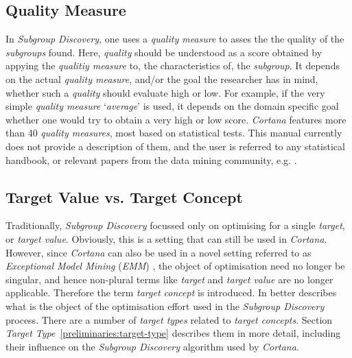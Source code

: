 \documentclass{article}
\begin{document}



\subsection{Quality Measure}
\label{preliminatier:quality-measure}
In \emph{Subgroup Discovery}, one uses a \emph{quality measure} to asses the the quality of the \emph{subgroups} found.
Here, \emph{quality} should be understood as a score obtained by appying the \emph{qualitiy measure} to, the characteristics of, the \emph{subgroup}.
It depends on the actual \emph{quality measure}, and/or the goal the researcher has in mind, whether such a \emph{quality} should evaluate high or low.
For example, if the very simple \emph{quality measure} `\emph{average}' is used, it depends on the domain specific goal whether one would try to obtain a very high or low score.
\emph{Cortana} features more than 40 \emph{quality measures}, most based on statistical tests.
This manual currently does not provide a description of them, and the user is referred to any statistical handbook, or relevant papers from the data mining community, e.g. \cite{shb,remauv}.



\subsection{Target Value vs. Target Concept}
\label{preliminaries:target-concept}
Traditionally, \emph{Subgroup Discovery} focussed only on optimising for a single \emph{target}, or \emph{target value}.
Obviously, this is a setting that can still be used in \emph{Cortana}.
However, since \emph{Cortana} can also be used in a novel setting referred to as \emph{Exceptional Model Mining} (\emph{EMM}) \cite{emm,sdmbn}, the object of optimisation need no longer be singular, and hence non-plural terms like \emph{target} and \emph{target value} are no longer applicable.
Therefore the term \emph{target concept} is introduced.
In better describes what is the object of the optimisation effort used in the \emph{Subgroup Discovery} process.
There are a number of \emph{target types} related to \emph{target concepts}.
Section \emph{Target Type}~\ref{preliminaries:target-type} describes them in more detail, including their influence on the \emph{Subgroup Discovery} algorithm used by \emph{Cortana}.
\end{document}

